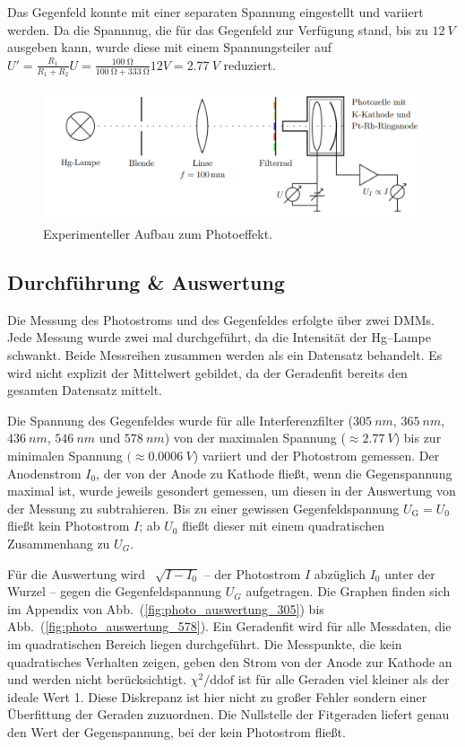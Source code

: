 \documentclass[sn-mathphys-num,iicol]{sn-jnl}
\theoremstyle{thmstyleone}
\theoremstyle{thmstyletwo}
\theoremstyle{thmstylethree}
\begin{document}
Das Gegenfeld konnte mit einer separaten Spannung eingestellt und variiert werden.
Da die Spannnug, die für das Gegenfeld zur Verfügung stand, bis zu $\SI{12}{V}$ ausgeben kann, wurde diese mit einem Spannungsteiler auf $U'=\tfrac{R_1}{R_1+R_2}U=\tfrac{\SI{100}{\ohm}}{\SI{100}{\ohm}+\SI{333}{\ohm}}12V=\SI{2.77}{V}$ reduziert.
\begin{figure}[t]
        \centering
        \includegraphics[width=.5\textwidth]{402_aufbau_photoeffekt.png}
        \caption{Experimenteller Aufbau zum Photoeffekt.} \label{fig:aufbau_photoeffekt}
\end{figure}

\subsection{Durchführung \& Auswertung}
Die Messung des Photostroms und des Gegenfeldes erfolgte über zwei DMMs.
Jede Messung wurde zwei mal durchgeführt, da die Intensität der Hg--Lampe schwankt.
Beide Messreihen zusammen werden als ein Datensatz behandelt.
Es wird nicht explizit der Mittelwert gebildet, da der Geradenfit bereits den gesamten Datensatz mittelt.

Die Spannung des Gegenfeldes wurde für alle Interferenzfilter ($\SI{305}{nm}$, $\SI{365}{n m}$, $\SI{436}{n m}$, $\SI{546}{n m}$ und $\SI{578}{n m}$) von der maximalen Spannung ($\approx \SI{2.77}{V}$) bis zur minimalen Spannung $(\approx \SI{0.0006}{V}$) variiert und der Photostrom gemessen.
Der Anodenstrom $I_0$, der von der Anode zu Kathode fließt, wenn die Gegenspannung maximal ist, wurde jeweils gesondert gemessen, um diesen in der Auswertung von der Messung zu subtrahieren.
Bis zu einer gewissen Gegenfeldspannung $U_\text{G}=U_0$ fließt kein Photostrom $I$; ab $U_0$ fließt dieser mit einem quadratischen Zusammenhang zu $U_G$.

Für die Auswertung wird $\,\sqrt[]{I-I_0}$ -- der Photostrom $I$ abzüglich $I_0$ unter der Wurzel -- gegen die Gegenfeldspannung $U_G$ aufgetragen.
Die Graphen finden sich im Appendix von Abb.\ (\ref{fig:photo_auswertung_305}) bis Abb.\ (\ref{fig:photo_auswertung_578}).
Ein Geradenfit wird für alle Messdaten, die im quadratischen Bereich liegen durchgeführt.
Die Messpunkte, die kein quadratisches Verhalten zeigen, geben den Strom von der Anode zur Kathode an und werden nicht berücksichtigt.
$\chi ^2/\text{ddof}$ ist für alle Geraden viel kleiner als der ideale Wert 1.
Diese Diskrepanz ist hier nicht zu großer Fehler sondern einer Überfittung der Geraden zuzuordnen.
Die Nullstelle der Fitgeraden liefert genau den Wert der Gegenspannung, bei der kein Photostrom fließt.
\end{document}
